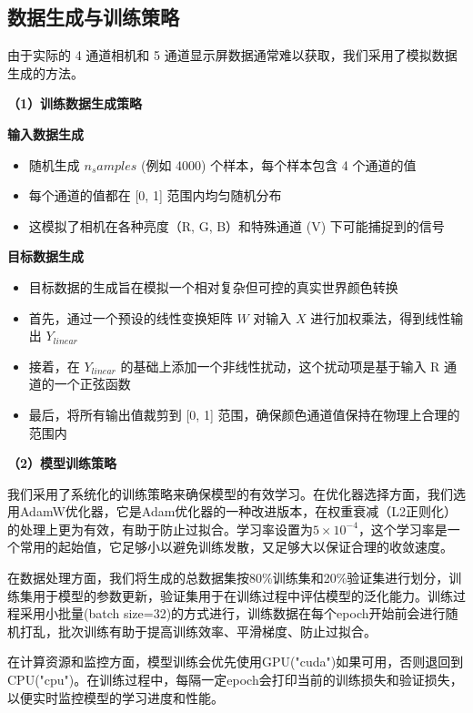 \subsection[\hspace{-2pt}数据生成与训练策略]{{\heiti{} \hspace{-8pt}数据生成与训练策略}}\label{section2: 数据生成与训练策略}

由于实际的 4 通道相机和 5 通道显示屏数据通常难以获取，我们采用了模拟数据生成的方法。

\noindent\textbf{（1）训练数据生成策略}

 \textbf{输入数据生成}
\begin{itemize}
    \item 随机生成 $n_samples$ (例如 4000) 个样本，每个样本包含 4 个通道的值
    \item 每个通道的值都在 [0, 1] 范围内均匀随机分布
    \item 这模拟了相机在各种亮度（R, G, B）和特殊通道 (V) 下可能捕捉到的信号
\end{itemize}

 \textbf{目标数据生成}
\begin{itemize}
    \item 目标数据的生成旨在模拟一个相对复杂但可控的真实世界颜色转换
    \item 首先，通过一个预设的线性变换矩阵 $W$ 对输入 $X$ 进行加权乘法，得到线性输出 $Y_{linear}$
    \item 接着，在 $Y_{linear}$ 的基础上添加一个非线性扰动，这个扰动项是基于输入 R 通道的一个正弦函数
    \item 最后，将所有输出值裁剪到 [0, 1] 范围，确保颜色通道值保持在物理上合理的范围内
\end{itemize}

\noindent\textbf{（2）模型训练策略}

我们采用了系统化的训练策略来确保模型的有效学习。在优化器选择方面，我们选用AdamW优化器\cite{loshchilov2017decoupled}，它是Adam优化器的一种改进版本，在权重衰减（L2正则化）的处理上更为有效，有助于防止过拟合。学习率设置为$5 \times 10^{-4}$，这个学习率是一个常用的起始值，它足够小以避免训练发散，又足够大以保证合理的收敛速度。

在数据处理方面，我们将生成的总数据集按80\%训练集和20\%验证集进行划分，训练集用于模型的参数更新，验证集用于在训练过程中评估模型的泛化能力。训练过程采用小批量(batch size=32)的方式进行，训练数据在每个epoch开始前会进行随机打乱，批次训练有助于提高训练效率、平滑梯度、防止过拟合。

在计算资源和监控方面，模型训练会优先使用GPU("cuda")如果可用，否则退回到CPU("cpu")。在训练过程中，每隔一定epoch会打印当前的训练损失和验证损失，以便实时监控模型的学习进度和性能。

